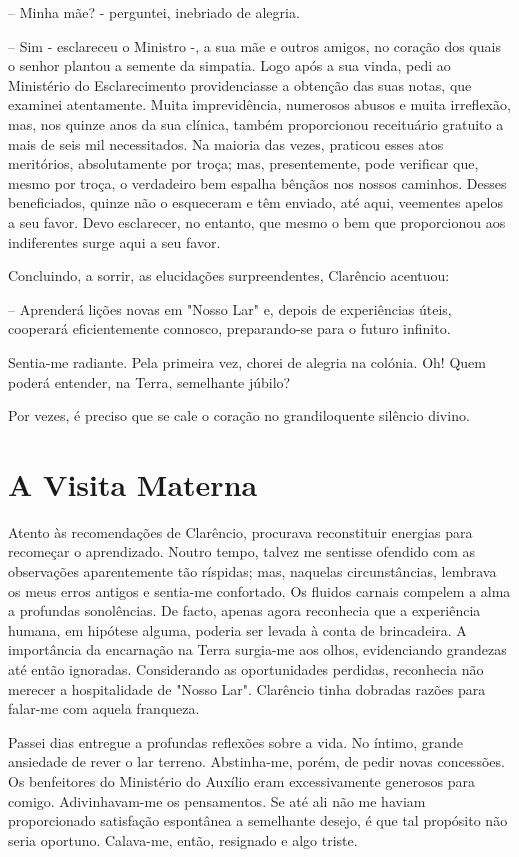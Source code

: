 \documentclass[portuguese,12pt,a4paper]{scrbook}
\begin{document}
	– Minha mãe? - perguntei, inebriado de alegria.
	
	– Sim - esclareceu o Ministro -, a sua mãe e outros amigos, no coração dos quais o senhor plantou a semente da simpatia. Logo após a sua vinda, pedi ao Ministério do Esclarecimento providenciasse a obtenção das suas notas, que examinei atentamente. Muita imprevidência, numerosos abusos e muita irreflexão, mas, nos quinze anos da sua clínica, também proporcionou receituário gratuito a mais de seis mil necessitados. Na maioria das vezes, praticou esses atos meritórios, absolutamente por troça; mas, presentemente, pode verificar que, mesmo por troça, o verdadeiro bem espalha bênçãos nos nossos caminhos. Desses beneficiados, quinze não o esqueceram e têm enviado, até aqui, veementes apelos a seu favor. Devo esclarecer, no entanto, que mesmo o bem que proporcionou aos indiferentes surge aqui a seu favor.
	
	Concluindo, a sorrir, as elucidações surpreendentes, Clarêncio acentuou:
	
	– Aprenderá lições novas em "Nosso Lar" e, depois de experiências úteis, cooperará eficientemente connosco, preparando-se para o futuro infinito.
	
	Sentia-me radiante. Pela primeira vez, chorei de alegria na colónia. Oh! Quem poderá entender, na Terra, semelhante júbilo?
	
	
	Por vezes, é preciso que se cale o coração no grandiloquente silêncio divino.
	
	
	\chapter{A Visita Materna}
	
	Atento às recomendações de Clarêncio, procurava reconstituir energias para recomeçar o aprendizado. Noutro tempo, talvez me sentisse ofendido com as observações aparentemente tão ríspidas; mas, naquelas circunstâncias, lembrava os meus erros antigos e sentia-me confortado. Os fluidos carnais compelem a alma a profundas sonolências. De facto, apenas agora reconhecia que a experiência humana, em hipótese alguma, poderia ser levada à conta de brincadeira. A importância da encarnação na Terra surgia-me aos olhos, evidenciando grandezas até então ignoradas. Considerando as oportunidades perdidas, reconhecia não merecer a hospitalidade de "Nosso Lar". Clarêncio tinha dobradas razões para falar-me com aquela franqueza.
	
	Passei dias entregue a profundas reflexões sobre a vida. No íntimo, grande ansiedade de rever o lar terreno. Abstinha-me, porém, de pedir novas concessões. Os benfeitores do Ministério do Auxílio eram excessivamente generosos para comigo. Adivinhavam-me os pensamentos. Se até ali não me haviam proporcionado satisfação espontânea a semelhante desejo, é que tal propósito não seria oportuno. Calava-me, então, resignado e algo triste.
	
\end{document}
